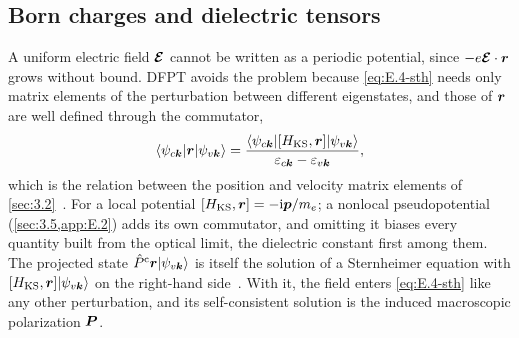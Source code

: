 \subsection{Born charges and dielectric tensors}

A uniform electric field $\bm{\mathcal{E}}$ cannot be written as a periodic potential, since $-e\bm{\mathcal{E}}\cdot\bm{r}$ grows without bound. DFPT avoids the problem because \cref{eq:E.4-sth} needs only matrix elements of the perturbation between different eigenstates, and those of $\bm{r}$ are well defined through the commutator,
\begin{equation}
  \langle\psi_{c\bm{k}}|\bm{r}|\psi_{v\bm{k}}\rangle = \frac{\langle\psi_{c\bm{k}}|[H_{\mathrm{KS}},\bm{r}]|\psi_{v\bm{k}}\rangle}{\varepsilon_{c\bm{k}} - \varepsilon_{v\bm{k}}} ,
  \label{eq:E.4-rcomm}
\end{equation}
which is the relation between the position and velocity matrix elements of \cref{sec:3.2}~\cite[Eq.~(37)]{baroni2001phonons}. For a local potential $[H_{\mathrm{KS}},\bm{r}] = -\mathrm{i}\bm{p}/m_e$; a nonlocal pseudopotential (\cref{sec:3.5,app:E.2}) adds its own commutator, and omitting it biases every quantity built from the optical limit, the dielectric constant first among them. The projected state $\hat{P}^{\mathrm{c}}\bm{r}|\psi_{v\bm{k}}\rangle$ is itself the solution of a Sternheimer equation with $[H_{\mathrm{KS}},\bm{r}]|\psi_{v\bm{k}}\rangle$ on the right-hand side~\cite[Eq.~(44)]{baroni2001phonons}. With it, the field enters \cref{eq:E.4-sth} like any other perturbation, and its self-consistent solution is the induced macroscopic polarization $\bm{P}$.

